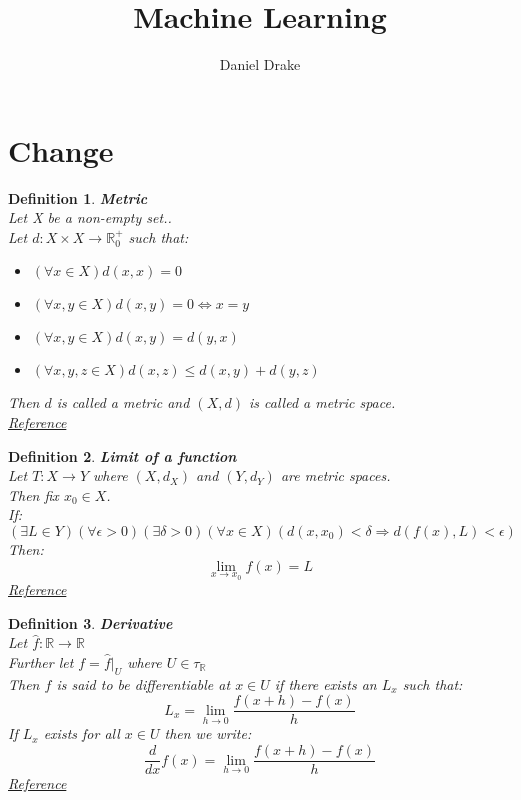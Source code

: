 \documentclass[12pt]{extarticle}
\title{Machine Learning}
\author{Daniel Drake}
\theoremstyle{plain}
\theoremstyle{Definition}
\newtheorem{def.}{Definition}[section]
\theoremstyle{Definition}
\theoremstyle{plain}
\begin{document}
		\maketitle			
\section{Change}
\begin{def.} \textbf{Metric} \\ 
	Let X be a non-empty set.. \\ 
	Let $d : X \times X \to \mathbb{R}^+_0$ such that: 
	\begin{itemize}
		\item $(\forall x \in X) d(x,x) = 0$
		\item $(\forall x,y \in X) d(x,y) = 0 \Leftrightarrow x = y$ 
		\item $(\forall x,y \in X) d(x,y) = d(y,x)$
		\item $(\forall x,y,z \in X) d(x,z) \leq d(x,y) + d(y,z)$
	\end{itemize}	
	Then $d$ is called a metric and $(X,d)$ is called a metric space. \\
	\href{https://en.wikipedia.org/wiki/Metric_space}{Reference}
\end{def.}
\begin{def.} \textbf{Limit of a function} \\ 
	Let $T : X \to Y$ where $(X,d_X)$ and $(Y,d_Y)$ are metric spaces. \\ 
	Then fix $x_0 \in X$. \\
	If:
	$$(\exists L \in Y)( \forall \epsilon > 0 )(\exists \delta > 0)(\forall x \in X)(d(x,x_0) < \delta \Rightarrow d(f(x),L) < \epsilon)$$
	Then: $$\lim_{x \to x_0} f(x) = L$$ 
	\href{https://en.wikipedia.org/wiki/Limit_of_a_function}{Reference}
\end{def.}
\begin{def.} \textbf{Derivative} \\ 
	Let $\hat{f} : \mathbb{R} \to \mathbb{R}$ \\ 
	Further let $f = \hat{f}|_U$ where $U \in \tau_\mathbb{R}$ \\ 
	Then $f$ is said to be differentiable at $x \in U$ if there exists an $L_x$ such that: \\ 
	$$L_x = \lim_{h \to 0} \frac{f(x + h) - f(x)}{h}$$
	If $L_x$ exists for all $x \in U$ then we write: \\ 
	$$\frac{d}{dx}f(x) = \lim_{h \to 0} \frac{f(x + h) - f(x)}{h}$$
	\href{https://en.wikipedia.org/wiki/Differentiable_function}{Reference}
\end{def.}
\end{document}
